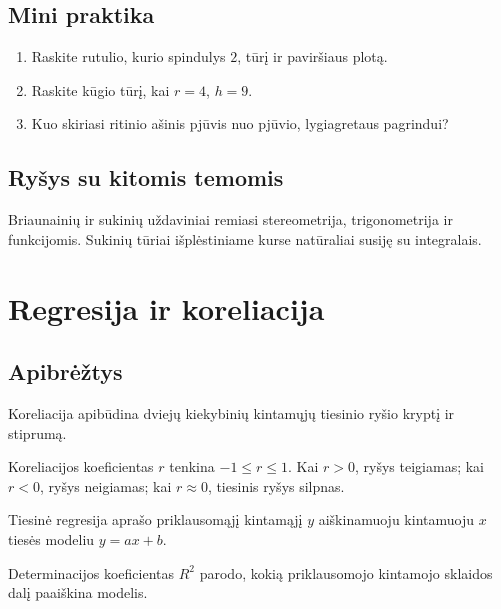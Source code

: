 \subsection{Mini praktika}
\begin{enumerate}[label=\alph*)]
\item Raskite rutulio, kurio spindulys \(2\), tūrį ir paviršiaus plotą.
\item Raskite kūgio tūrį, kai \(r=4\), \(h=9\).
\item Kuo skiriasi ritinio ašinis pjūvis nuo pjūvio, lygiagretaus pagrindui?
\end{enumerate}

\subsection{Ryšys su kitomis temomis}
Briaunainių ir sukinių uždaviniai remiasi stereometrija, trigonometrija ir funkcijomis. Sukinių tūriai išplėstiniame kurse natūraliai susiję su integralais.

\section{Regresija ir koreliacija}\label{sec:regresija-ir-koreliacija}

\subsection{Apibrėžtys}
\begin{apibreztis}
Koreliacija apibūdina dviejų kiekybinių kintamųjų tiesinio ryšio kryptį ir stiprumą.
\end{apibreztis}
\begin{apibreztis}
Koreliacijos koeficientas \(r\) tenkina \(-1\le r\le1\). Kai \(r>0\), ryšys teigiamas; kai \(r<0\), ryšys neigiamas; kai \(r\approx0\), tiesinis ryšys silpnas.
\end{apibreztis}
\begin{apibreztis}
Tiesinė regresija aprašo priklausomąjį kintamąjį \(y\) aiškinamuoju kintamuoju \(x\) tiesės modeliu \(y=ax+b\).
\end{apibreztis}
\begin{apibreztis}
Determinacijos koeficientas \(R^2\) parodo, kokią priklausomojo kintamojo sklaidos dalį paaiškina modelis.
\end{apibreztis}

